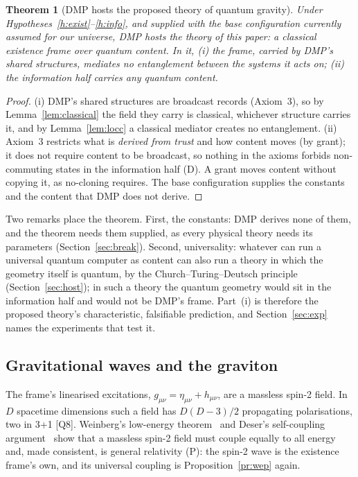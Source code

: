 \documentclass[11pt,a4paper]{article}
\newtheorem{theorem}{Theorem}
\theoremstyle{definition}
\theoremstyle{remark}
\newcommand{\chk}[1]{\textsf{[#1]}}
\newcommand{\tagD}{\textsf{(D)}}
\newcommand{\tagP}{\textsf{(P)}}
\theoremstyle{definition}
\begin{document}
\begin{theorem}[DMP hosts the proposed theory of quantum gravity]\label{th:host}
Under Hypotheses~\ref{h:exist}--\ref{h:info}, and supplied with the base configuration currently assumed for our universe, DMP hosts the
theory of this paper: a classical existence frame over quantum content. In it, (i) the frame, carried by DMP's shared structures, mediates
no entanglement between the systems it acts on; (ii) the information half carries any quantum content.
\end{theorem}

\begin{proof}
(i) DMP's shared structures are broadcast records (Axiom~3), so by Lemma~\ref{lem:classical} the field they carry is classical, whichever
structure carries it, and by Lemma~\ref{lem:locc} a classical mediator creates no entanglement. (ii) Axiom~3 restricts what is
\emph{derived from trust} and how content moves (by grant); it does not require content to be broadcast, so nothing in the axioms forbids
non-commuting states in the information half \tagD. A grant moves content without copying it, as no-cloning requires. The base
configuration supplies the constants and the content that DMP does not derive.
\end{proof}

Two remarks place the theorem. First, the constants: DMP derives none of them, and the theorem needs them supplied, as every physical
theory needs its parameters (Section~\ref{sec:break}). Second, universality: whatever can run a universal quantum computer as content can
also run a theory in which the geometry itself is quantum, by the Church--Turing--Deutsch principle~\cite{deutsch} (Section~\ref{sec:host});
in such a theory the quantum geometry would sit in the information half and would not be DMP's frame. Part~(i) is therefore the proposed
theory's characteristic, falsifiable prediction, and Section~\ref{sec:exp} names the experiments that test it.

\subsection{Gravitational waves and the graviton}

The frame's linearised excitations, $g_{\mu\nu}=\eta_{\mu\nu}+h_{\mu\nu}$, are a massless spin-2 field. In $D$ spacetime dimensions such a
field has $D(D-3)/2$ propagating polarisations, two in 3+1 \chk{Q8}. Weinberg's low-energy theorem~\cite{weinberg64} and Deser's
self-coupling argument~\cite{deser70} show that a massless spin-2 field must couple equally to all energy and, made consistent, is general
relativity \tagP: the spin-2 wave is the existence frame's own, and its universal coupling is Proposition~\ref{pr:wep} again.
\end{document}
